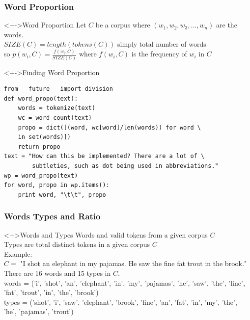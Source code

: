 \documentclass[serif,11pt,aspectratio=1610,table]{beamer}
\begin{document}
\begin{frame}[fragile]
 \frametitle{Word Proportion}
\begin{block}<+->{Word Proportion}
 Let $C$ be a corpus where $(w_{1},w_{2},w_{3},...,w_{n})$ are the words.\\
 $SIZE(C) = length(tokens(C))$ simply total number of words\\
 so $ p(w_{i},C) = \frac{f(w_{i},C)}{SIZE(C)} $ where $f(w_{i},C)$ is the frequency of $w_{i}$ in $C$
\end{block}

\begin{block}<+->{Finding Word Proportion}
 \footnotesize
\begin{verbatim}
from __future__ import division
def word_propo(text):
    words = tokenize(text)
    wc = word_count(text)
    propo = dict([(word, wc[word]/len(words)) for word \
    in set(words)])
    return propo
text = "How can this be implemented? There are a lot of \
        subtleties, such as dot being used in abbreviations."
wp = word_propo(text)
for word, propo in wp.items():
    print word, "\t\t", propo
\end{verbatim}

\end{block}

\end{frame}


\begin{frame}[fragile]
 \frametitle{Words Types and Ratio}
\begin{block}<+>{Words and Types}
 Words and valid tokens from a given corpus $C$ \\
 Types are total distinct tokens in a given corpus $C$ \\
 Example: \\
 $C = $ "I shot an elephant in my pajamas. He saw the fine fat trout in the brook."\\
 There are 16 words and 15 types in $C$. \\
 \footnotesize
 words = ('i', 'shot', 'an', 'elephant', 'in', 'my', 'pajamas', 
 'he', 'saw', 'the', 'fine', 'fat', 'trout', 'in', 'the', 'brook') \\
 types = ('shot', 'i', 'saw', 'elephant', 'brook', 'fine', 'an', 
 'fat', 'in', 'my', 'the', 'he', 'pajamas', 'trout')
\end{block}

\end{frame}
\end{document}
